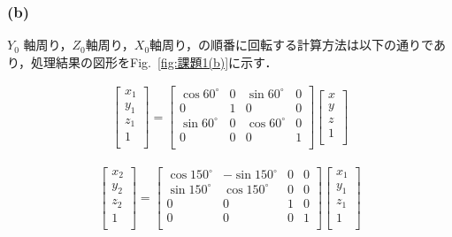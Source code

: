 \documentclass[a4paper,10pt]{jsarticle}
\begin{document}
\subsubsection{(b)}
$Y_0$ 軸周り，$Z_0$軸周り，$X_0$軸周り，の順番に回転する計算方法は以下の通りであり，処理結果の図形をFig.~\ref{fig:課題1(b)}に示す．

\begin{eqnarray}
\label{eq:d}
  \left[
    \begin{array}{c}
      x_1\\
      y_1\\
      z_1\\
      1\\
    \end{array}
  \right] =
  \left[
    \begin{array}{cccc}
      \cos{60^\circ} & 0 & \sin{60^\circ} & 0 \\
      0 & 1 & 0 & 0\\
      \sin{60^\circ} & 0 & \cos{60^\circ} & 0\\
      0 & 0 & 0 & 1\\
    \end{array}
  \right]\left[
    \begin{array}{c}
      x\\
      y\\
      z\\
      1\\
    \end{array}
  \right]
\end{eqnarray}

\begin{eqnarray}
\label{eq:e}
  \left[
    \begin{array}{c}
      x_2\\
      y_2\\
      z_2\\
      1\\
    \end{array}
  \right] =
  \left[
    \begin{array}{cccc}
      \cos{150^\circ} & -\sin{150^\circ} & 0 & 0 \\
      \sin{150^\circ} & \cos{150^\circ} & 0 & 0\\
      0 & 0 & 1 & 0\\
      0 & 0 & 0 & 1\\
    \end{array}
  \right]\left[
    \begin{array}{c}
      x_1\\
      y_1\\
      z_1\\
      1\\
    \end{array}
  \right]
\end{eqnarray}
\end{document}
